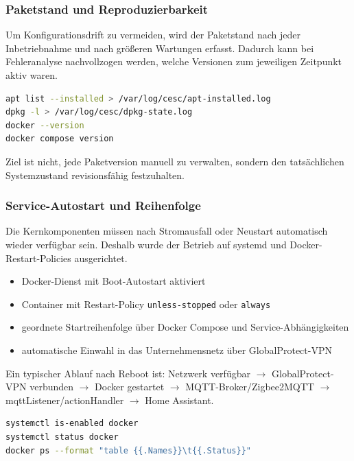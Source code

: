 \subsubsection{Paketstand und Reproduzierbarkeit}

Um Konfigurationsdrift zu vermeiden, wird der Paketstand nach jeder Inbetriebnahme und nach größeren Wartungen erfasst. Dadurch kann bei Fehleranalyse nachvollzogen werden, welche Versionen zum jeweiligen Zeitpunkt aktiv waren.

\begin{lstlisting}[language=bash,caption={Dokumentation des Paketstands},label={lst:raspi_package_state},basicstyle=\ttfamily\small]
apt list --installed > /var/log/cesc/apt-installed.log
dpkg -l > /var/log/cesc/dpkg-state.log
docker --version
docker compose version
\end{lstlisting}

Ziel ist nicht, jede Paketversion manuell zu verwalten, sondern den tatsächlichen Systemzustand revisionsfähig festzuhalten.

\subsubsection{Service-Autostart und Reihenfolge}

Die Kernkomponenten müssen nach Stromausfall oder Neustart automatisch wieder verfügbar sein. Deshalb wurde der Betrieb auf systemd und Docker-Restart-Policies ausgerichtet.

\begin{itemize}
    \item Docker-Dienst mit Boot-Autostart aktiviert
    \item Container mit Restart-Policy \texttt{unless-stopped} oder \texttt{always}
    \item geordnete Startreihenfolge über Docker Compose und Service-Abhängigkeiten
    \item automatische Einwahl in das Unternehmensnetz über GlobalProtect-VPN
\end{itemize}

Ein typischer Ablauf nach Reboot ist: Netzwerk verfügbar $\rightarrow$ GlobalProtect-VPN verbunden $\rightarrow$ Docker gestartet $\rightarrow$ MQTT-Broker/Zigbee2MQTT $\rightarrow$ mqttListener/actionHandler $\rightarrow$ Home Assistant.

\begin{lstlisting}[language=bash,caption={Prüfung von Autostart und Servicezustand},label={lst:raspi_autostart_check},basicstyle=\ttfamily\small]
systemctl is-enabled docker
systemctl status docker
docker ps --format "table {{.Names}}\t{{.Status}}"
\end{lstlisting}

